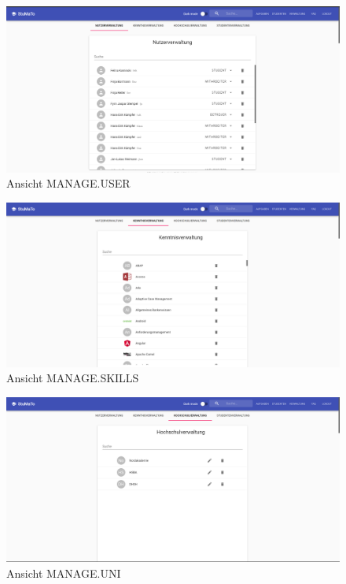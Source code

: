 \documentclass[
  12pt,
  ngerman,
  a4paper,
]{article}
\begin{document}
\begin{figure}
\centering
\includegraphics{./tex2pdf.-930e6666e1221838/a755eb96a92ad6d15e845ce1cce757327b2d571b.png}
\caption{Ansicht MANAGE.USER}
\end{figure}

\begin{figure}
\centering
\includegraphics{./tex2pdf.-930e6666e1221838/ce3458428610c575dda494aa3efaffc445fa738a.png}
\caption{Ansicht MANAGE.SKILLS}
\end{figure}

\begin{figure}
\centering
\includegraphics{./tex2pdf.-930e6666e1221838/84843a33decc9c7d289ff6cdcdf6eee152dcc7c0.png}
\caption{Ansicht MANAGE.UNI}
\end{figure}
\end{document}
